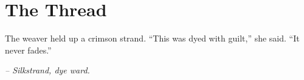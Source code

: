 \chapter*{The Thread}

The weaver held up a crimson strand. “This was dyed with guilt,” she said. “It never fades.”

\smallskip

\noindent \textit{– Silkstrand, dye ward.}

